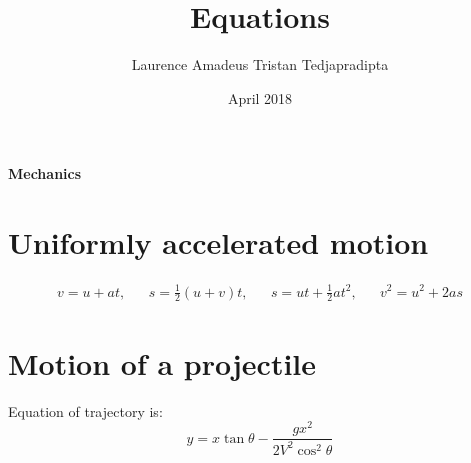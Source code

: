 \documentclass[a4paper]{article}
\title{Equations}
\author{Laurence Amadeus Tristan Tedjapradipta}
\date{April 2018}
\begin{document}
\begin{center}
    \Large{\textbf{Mechanics}}
\end{center}

\section{Uniformly accelerated motion}
\begin{align}
    v = u + at,  &&  s = \frac{1}{2}(u+v)t,  &&  s = ut + \frac{1}{2}at^2,  &&  v^2 = u^2 + 2as
\end{align}

\section{Motion of a projectile}
\quad \enspace{} Equation of trajectory is:
\begin{equation}
  y = x \tan{\theta} - \frac{gx^2}{2V^2 \cos^2 \theta}
\end{equation}
\end{document}
